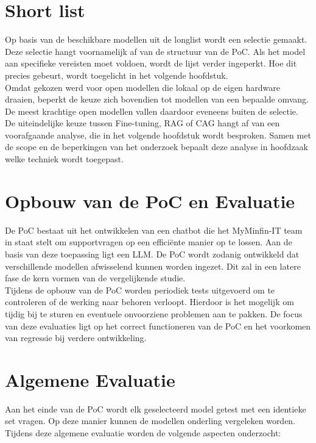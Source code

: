 \section{Short list}

Op basis van de beschikbare modellen uit de longlist wordt een selectie gemaakt. Deze selectie hangt voornamelijk af van de structuur van de PoC. Als het model aan specifieke vereisten moet voldoen, wordt de lijst verder ingeperkt. Hoe dit precies gebeurt, wordt toegelicht in het volgende hoofdstuk.
\\[1em]
Omdat gekozen werd voor open modellen die lokaal op de eigen hardware draaien, beperkt de keuze zich bovendien tot modellen van een bepaalde omvang. De meest krachtige open modellen vallen daardoor eveneens buiten de selectie.
\\[1em]
De uiteindelijke keuze tussen Fine-tuning, RAG of CAG hangt af van een voorafgaande analyse, die in het volgende hoofdstuk wordt besproken. Samen met de scope en de beperkingen van het onderzoek bepaalt deze analyse in hoofdzaak welke techniek wordt toegepast.

\section{Opbouw van de PoC en Evaluatie}

De PoC bestaat uit het ontwikkelen van een chatbot die het MyMinfin-IT team in staat stelt om supportvragen op een efficiënte manier op te lossen. Aan de basis van deze toepassing ligt een LLM. De PoC wordt zodanig ontwikkeld dat verschillende modellen afwisselend kunnen worden ingezet. Dit zal in een latere fase de kern vormen van de vergelijkende studie.
\\[1em]
Tijdens de opbouw van de PoC worden periodiek tests uitgevoerd om te controleren of de werking naar behoren verloopt. Hierdoor is het mogelijk om tijdig bij te sturen en eventuele onvoorziene problemen aan te pakken. De focus van deze evaluaties ligt op het correct functioneren van de PoC en het voorkomen van regressie bij verdere ontwikkeling.

\section{Algemene Evaluatie}

Aan het einde van de PoC wordt elk geselecteerd model getest met een identieke set vragen. Op deze manier kunnen de modellen onderling vergeleken worden. Tijdens deze algemene evaluatie worden de volgende aspecten onderzocht:


